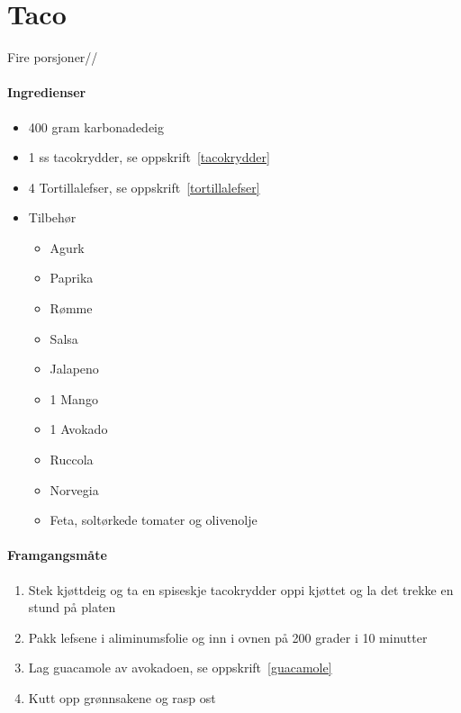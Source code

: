\section{Taco}
\label{taco}

Fire porsjoner//

\paragraph{Ingredienser}
\begin{itemize}[noitemsep]
	\item 400 gram karbonadedeig
	\item 1 ss tacokrydder, se oppskrift~\ref{tacokrydder}
	\item 4 Tortillalefser, se oppskrift~\ref{tortillalefser}
	\item Tilbehør
		\begin{itemize}[noitemsep]
			\item Agurk
			\item Paprika
			\item Rømme
			\item Salsa
			\item Jalapeno
			\item 1 Mango
			\item 1 Avokado
			\item Ruccola
			\item Norvegia
			\item Feta, soltørkede tomater og olivenolje
			\end{itemize}
\end{itemize}

\paragraph{Framgangsmåte}
\begin{enumerate}[noitemsep]
	\item Stek kjøttdeig og ta en spiseskje tacokrydder oppi kjøttet og la det trekke en stund på platen
	\item Pakk lefsene i aliminumsfolie og inn i ovnen på 200 grader i 10 minutter
	\item Lag guacamole av avokadoen, se oppskrift~\ref{guacamole}
	\item Kutt opp grønnsakene og rasp ost
\end{enumerate}
